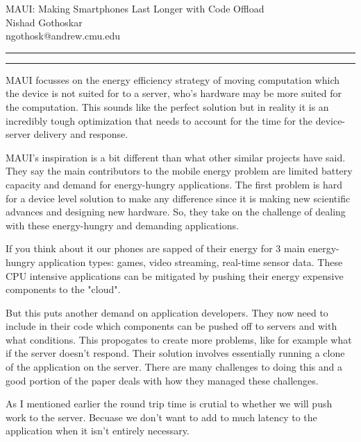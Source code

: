 \documentclass[11pt]{article}
\newcommand{\question}[2] {\vspace{.25in} \hrule\vspace{0.5em}
	\noindent{\bf #1: #2} \vspace{0.5em}
	\hrule \vspace{.10in}}
\newcommand{\myname}{Nishad Gothoskar}
\newcommand{\myandrew}{ngothosk}
\begin{document}
	
	\medskip                        %
	
	\thispagestyle{plain}
	\begin{center}                  %
		{\Large MAUI: Making Smartphones Last Longer with Code Offload} \\
		\myname \\
		\myandrew @andrew.cmu.edu\\
	\end{center}
	
	\question{1}{Summary}
	\quad MAUI focusses on the energy efficiency strategy of moving computation which the device is not suited for to a server, who's hardware may be more suited for the computation.  This sounds like the perfect solution but in reality it is an incredibly tough optimization that needs to account for the time for the device-server delivery and response.
	
	\quad MAUI's inspiration is a bit different than what other similar projects have said. They say the main contributors to the mobile energy problem are limited battery capacity and demand for energy-hungry applications. The first problem is hard for a device level solution to make any difference since it is making new scientific advances and designing new hardware. So, they take on the challenge of dealing with these energy-hungry and demanding applications.
	
	\quad If you think about it our phones are sapped of their energy for 3 main energy-hungry application types: games, video streaming, real-time sensor data. These CPU intensive applications can be mitigated by pushing their energy expensive components to the "cloud".
	
	\quad But this puts another demand on application developers. They now need to include in their code which components can be pushed off to servers and with what conditions. This propogates to create more problems, like for example what if the server doesn't respond. Their solution involves essentially running a clone of the application on the server. There are many challenges to doing this and a good portion of the paper deals with how they managed these challenges.
	
	\quad As I mentioned earlier the round trip time is crutial to whether we will push work to the server. Becuase we don't want to add to much latency to the application when it isn't entirely necessary.
	
\end{document}
